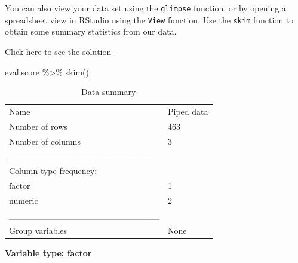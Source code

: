 \documentclass[
  letterpaper,
  DIV=11,
  numbers=noendperiod]{scrartcl}
\newenvironment{Shaded}{\begin{snugshade}}{\end{snugshade}}
\newcommand{\FunctionTok}[1]{\textcolor[rgb]{0.28,0.35,0.67}{#1}}
\newcommand{\NormalTok}[1]{\textcolor[rgb]{0.00,0.23,0.31}{#1}}
\newcommand{\SpecialCharTok}[1]{\textcolor[rgb]{0.37,0.37,0.37}{#1}}
\begin{document}
\begin{tcolorbox}[enhanced jigsaw, coltitle=black, bottomtitle=1mm, arc=.35mm, colframe=quarto-callout-warning-color-frame, left=2mm, opacityback=0, colback=white, title={Task 1}, toptitle=1mm, titlerule=0mm, breakable, rightrule=.15mm, bottomrule=.15mm, toprule=.15mm, colbacktitle=quarto-callout-warning-color!10!white, leftrule=.75mm, opacitybacktitle=0.6]

You can also view your data set using the \texttt{glimpse} function, or
by opening a spreadsheet view in RStudio using the \texttt{View}
function. Use the \texttt{skim} function to obtain some summary
statistics from our data.

Click here to see the solution

\begin{Shaded}
\begin{Highlighting}[]
\NormalTok{eval.score }\SpecialCharTok{\%\textgreater{}\%}
  \FunctionTok{skim}\NormalTok{()}
\end{Highlighting}
\end{Shaded}

\begin{longtable}[]{@{}ll@{}}
\caption{Data summary}\tabularnewline
\toprule\noalign{}
\endfirsthead
\endhead
\bottomrule\noalign{}
\endlastfoot
Name & Piped data \\
Number of rows & 463 \\
Number of columns & 3 \\
\_\_\_\_\_\_\_\_\_\_\_\_\_\_\_\_\_\_\_\_\_\_\_ & \\
Column type frequency: & \\
factor & 1 \\
numeric & 2 \\
\_\_\_\_\_\_\_\_\_\_\_\_\_\_\_\_\_\_\_\_\_\_\_\_ & \\
Group variables & None \\
\end{longtable}

\textbf{Variable type: factor}


\end{tcolorbox}
\end{document}

